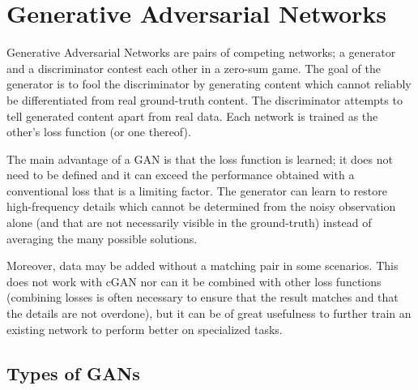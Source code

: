 \chapter{Generative Adversarial Networks}

Generative Adversarial Networks are pairs of competing networks; a generator and a discriminator contest each other in a zero-sum game. The goal of the generator is to fool the discriminator by generating content which cannot reliably be differentiated from real ground-truth content. The discriminator attempts to tell generated content apart from real data. Each network is trained as the other's loss function (or one thereof).

The main advantage of a \acl{GAN} is that the loss function is learned; it does not need to be defined and it can exceed the performance obtained with a conventional loss that is a limiting factor. The generator can learn to restore high-frequency details which cannot be determined from the noisy observation alone (and that are not necessarily visible in the ground-truth) instead of averaging the many possible solutions.

Moreover, data may be added without a matching pair in some scenarios. This does not work with \acl{cGAN} nor can it be combined with other loss functions (combining losses is often necessary to ensure that the result matches and that the details are not overdone), but it can be of great usefulness to further train an existing network to perform better on specialized tasks.

\section{Types of GANs}

